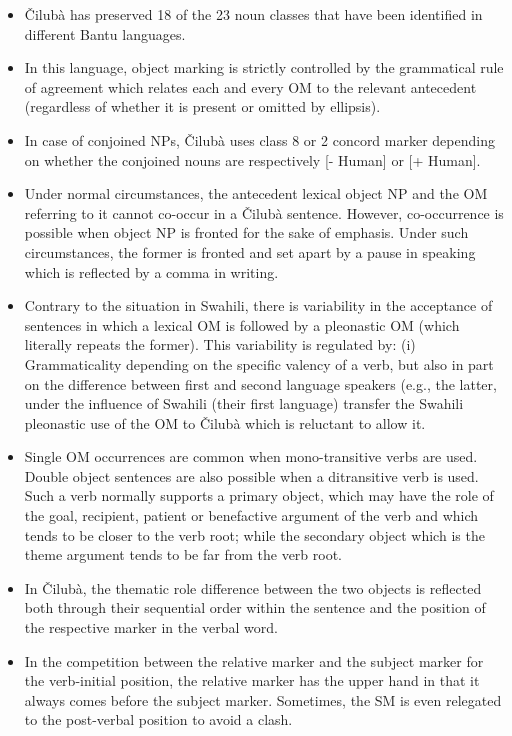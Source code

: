 \documentclass[output=paper]{langscibook}
\begin{document}
\begin{itemize}
\item Čilubà has preserved 18 of the 23 noun classes that have been identified in different Bantu languages.
\item In this language, object marking is strictly controlled by the grammatical rule of agreement which relates each and every OM to the relevant antecedent (regardless of whether it is present or omitted by ellipsis).
\item In case of conjoined NPs, Čilubà uses class 8 or 2 concord marker depending on whether the conjoined nouns are respectively [- Human] or [+ Human].
\item Under normal circumstances, the antecedent lexical object NP and the OM referring to it cannot co-occur in a Čilubà sentence. However, co-occurrence is possible when object NP is fronted for the sake of emphasis. Under such circumstances, the former is fronted and set apart by a pause in speaking which is reflected by a comma in writing.
\item Contrary to the situation in Swahili, there is variability in the acceptance of sentences in which a lexical OM is followed by a pleonastic OM (which literally repeats the former). This variability is regulated by: (i) Grammaticality depending on the specific valency of a verb, but also in part on the difference between first and second language speakers (e.g., the latter, under the influence of Swahili (their first language) transfer the Swahili pleonastic use of the OM to Čilubà which is reluctant to allow it.~
\item Single OM occurrences are common when mono-transitive verbs are used. Double object sentences are also possible when a ditransitive verb is used. Such a verb normally supports a primary object, which may have the role of the goal, recipient, patient or benefactive argument of the verb and which tends to be closer to the verb root; while the secondary object which is the theme argument tends to be far from the verb root.
\item In Čilubà, the thematic role difference between the two objects is reflected both through their sequential order within the sentence and the position of the respective marker in the verbal word.
\item In the competition between the relative marker and the subject marker for the verb-initial position, the relative marker has the upper hand in that it always comes before the subject marker. Sometimes, the SM is even relegated to the post-verbal position to avoid a clash.
\end{itemize}

\sloppy\printbibliography[heading=subbibliography,notkeyword=this]
\end{document}
